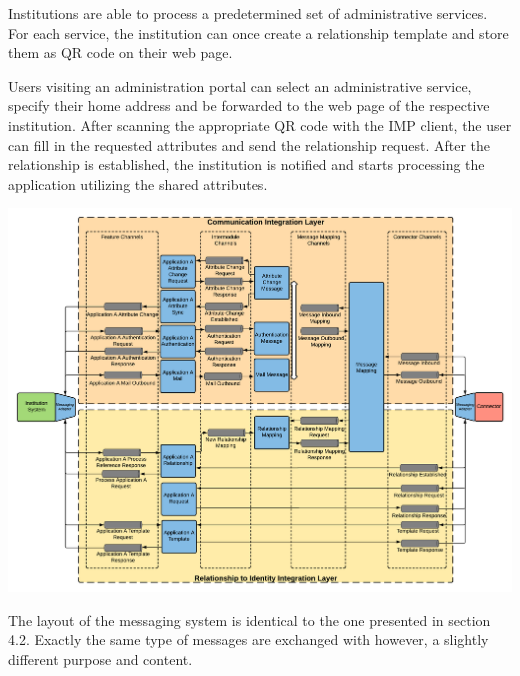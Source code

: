 Institutions are able to process a predetermined set of administrative services. For each service, the institution can once create a relationship template and store them as QR code on their web page. 

Users visiting an administration portal can select an administrative service, specify their home address and be forwarded to the web page of the respective institution. After scanning the appropriate QR code with the IMP client, the user can fill in the requested attributes and send the relationship request. After the relationship is established, the institution is notified and starts processing the application utilizing the shared attributes.

\begin{center}
    \includegraphics[scale=0.5]{Diagrams/Integration Architecture 2/Technological Integration/2. Messaging Overview.pdf}
\end{center}

The layout of the messaging system is identical to the one presented in section 4.2. Exactly the same type of messages are exchanged with however, a slightly different purpose and content. 

